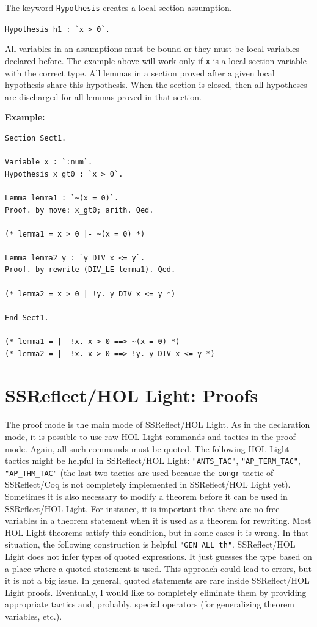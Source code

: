 \documentclass[a4paper]{article}
\begin{document}
The keyword \verb|Hypothesis| creates a local section assumption.

\verb|Hypothesis h1 : `x > 0`.|

All variables in an assumptions must be bound or they must be local variables declared before. The example above will work only if \verb|x| is a local section variable with the correct type. All lemmas in a section proved after a given local hypothesis share this hypothesis. When the section is closed, then all hypotheses are discharged for all lemmas proved in that section. 

{\bf Example:}
\begin{verbatim}
Section Sect1.

Variable x : `:num`.
Hypothesis x_gt0 : `x > 0`.

Lemma lemma1 : `~(x = 0)`.
Proof. by move: x_gt0; arith. Qed.

(* lemma1 = x > 0 |- ~(x = 0) *)

Lemma lemma2 y : `y DIV x <= y`.
Proof. by rewrite (DIV_LE lemma1). Qed.

(* lemma2 = x > 0 | !y. y DIV x <= y *)

End Sect1.

(* lemma1 = |- !x. x > 0 ==> ~(x = 0) *)
(* lemma2 = |- !x. x > 0 ==> !y. y DIV x <= y *)
\end{verbatim}


\section{SSReflect/HOL Light: Proofs}
The proof mode is the main mode of SSReflect/HOL Light. As in the declaration mode, it is possible to use raw HOL Light commands and tactics in the proof mode. Again, all such commands must be quoted. The following HOL Light tactics might be helpful in SSReflect/HOL Light: \verb|"ANTS_TAC"|, \verb|"AP_TERM_TAC"|, \verb|"AP_THM_TAC"| (the last two tactics are used because the \verb|congr| tactic of SSReflect/Coq is not completely implemented in SSReflect/HOL Light yet). Sometimes it is also necessary to modify a theorem before it can be used in SSReflect/HOL Light. For instance, it is important that there are no free variables in a theorem statement when it is used as a theorem for rewriting. Most HOL Light theorems satisfy this condition, but in some cases it is wrong. In that situation, the following construction is helpful \verb|"GEN_ALL th"|. SSReflect/HOL Light does not infer types of quoted expressions. It just guesses the type based on a place where a quoted statement is used. This approach could lead to errors, but it is not a big issue. In general, quoted statements are rare inside SSReflect/HOL Light proofs. Eventually, I would like to completely eliminate them by providing appropriate tactics and, probably, special operators (for generalizing theorem variables, etc.).
\end{document}
